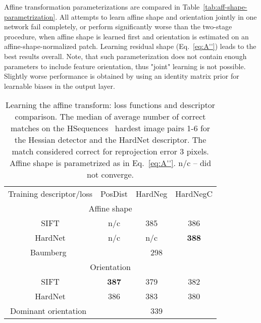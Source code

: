 \documentclass[runningheads]{llncs}
\newcommand{\ra}[1]{\renewcommand{\arraystretch}{#1}}
\begin{document}
Affine transformation parameterizations are compared in Table~\ref{tab:aff-shape-parametrization}. All attempts to learn affine shape and orientation jointly in one network fail completely, or perform significantly worse than the two-stage procedure, when affine shape is learned first and orientation is estimated on an affine-shape-normalized patch. 
Learning residual shape  (Eq.~\ref{eq:A''}) leads to the best results overall. Note, that such parameterization does not contain enough parameters to include feature orientation, thus "joint" learning is not possible. Slightly worse performance is obtained by using an identity matrix prior for learnable biases in the output layer. \begin{table}[htb]\ra{1}
\centering
\caption{Learning the affine transform: loss functions and descriptor comparison. The median of average number of correct matches on the HSequences~\cite{hpatches2017} hardest image pairs 1-6 for the Hessian detector and the HardNet descriptor. The match considered correct for reprojection error  3 pixels. Affine shape is parametrized as in Eq.~\ref{eq:A''}. n/c -- did not converge.}
\label{tab:desc-and-loss}
\setlength{\tabcolsep}{2mm}
\begin{tabular}{cccc}
\toprule
Training descriptor/loss & PosDist& HardNeg & HardNegC  \\
\cmidrule(r){1-4}
\multicolumn{4}{c}{Affine shape}\\
\cmidrule(r){1-4}
SIFT & n/c & 385 &  386 \\
HardNet & n/c & n/c &  \textbf{388} \\
\cmidrule(r){1-4}
Baumberg~\cite{Baumberg2000} &\multicolumn{3}{c}{298}  \\
\cmidrule(r){1-4}
\multicolumn{4}{c}{Orientation}\\
\cmidrule(r){1-4}
SIFT &  \textbf{387} & 379 &  382 \\
HardNet & 386 & 383 & 380 \\
\cmidrule(r){1-4}
Dominant orientation~\cite{SIFT2004} &\multicolumn{3}{c}{339}  \\
\bottomrule
\end{tabular}
\end{table}
\end{document}
